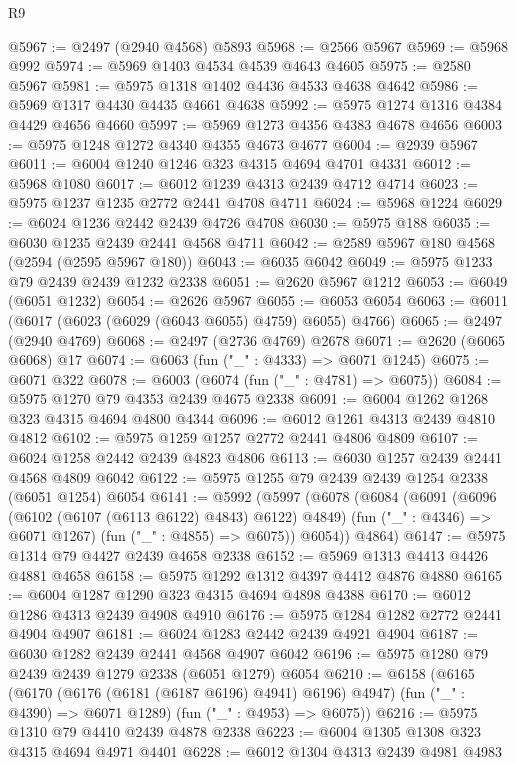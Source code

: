 \begin{lexlean}{R9}
\begin{coremodule}
@5967 := @2497 (@2940 @4568) @5893
@5968 := @2566 @5967
@5969 := @5968 @992
@5974 := @5969 @1403 @4534 @4539 @4643 @4605
@5975 := @2580 @5967
@5981 := @5975 @1318 @1402 @4436 @4533 @4638 @4642
@5986 := @5969 @1317 @4430 @4435 @4661 @4638
@5992 := @5975 @1274 @1316 @4384 @4429 @4656 @4660
@5997 := @5969 @1273 @4356 @4383 @4678 @4656
@6003 := @5975 @1248 @1272 @4340 @4355 @4673 @4677
@6004 := @2939 @5967
@6011 := @6004 @1240 @1246 @323 @4315 @4694 @4701 @4331
@6012 := @5968 @1080
@6017 := @6012 @1239 @4313 @2439 @4712 @4714
@6023 := @5975 @1237 @1235 @2772 @2441 @4708 @4711
@6024 := @5968 @1224
@6029 := @6024 @1236 @2442 @2439 @4726 @4708
@6030 := @5975 @188
@6035 := @6030 @1235 @2439 @2441 @4568 @4711
@6042 := @2589 @5967 @180 @4568 (@2594 (@2595 @5967 @180))
@6043 := @6035 @6042
@6049 := @5975 @1233 @79 @2439 @2439 @1232 @2338
@6051 := @2620 @5967 @1212
@6053 := @6049 (@6051 @1232)
@6054 := @2626 @5967
@6055 := @6053 @6054
@6063 := @6011 (@6017 (@6023 (@6029 (@6043 @6055) @4759) @6055) @4766)
@6065 := @2497 (@2940 @4769)
@6068 := @2497 (@2736 @4769) @2678
@6071 := @2620 (@6065 @6068) @17
@6074 := @6063 (fun ("_" : @4333) => @6071 @1245)
@6075 := @6071 @322
@6078 := @6003 (@6074 (fun ("_" : @4781) => @6075))
@6084 := @5975 @1270 @79 @4353 @2439 @4675 @2338
@6091 := @6004 @1262 @1268 @323 @4315 @4694 @4800 @4344
@6096 := @6012 @1261 @4313 @2439 @4810 @4812
@6102 := @5975 @1259 @1257 @2772 @2441 @4806 @4809
@6107 := @6024 @1258 @2442 @2439 @4823 @4806
@6113 := @6030 @1257 @2439 @2441 @4568 @4809 @6042
@6122 := @5975 @1255 @79 @2439 @2439 @1254 @2338 (@6051 @1254) @6054
@6141 := @5992
    (@5997
      (@6078
        (@6084
          (@6091
            (@6096 (@6102 (@6107 (@6113 @6122) @4843) @6122) @4849)
            (fun ("_" : @4346) => @6071 @1267)
            (fun ("_" : @4855) => @6075))
          @6054))
      @4864)
@6147 := @5975 @1314 @79 @4427 @2439 @4658 @2338
@6152 := @5969 @1313 @4413 @4426 @4881 @4658
@6158 := @5975 @1292 @1312 @4397 @4412 @4876 @4880
@6165 := @6004 @1287 @1290 @323 @4315 @4694 @4898 @4388
@6170 := @6012 @1286 @4313 @2439 @4908 @4910
@6176 := @5975 @1284 @1282 @2772 @2441 @4904 @4907
@6181 := @6024 @1283 @2442 @2439 @4921 @4904
@6187 := @6030 @1282 @2439 @2441 @4568 @4907 @6042
@6196 := @5975 @1280 @79 @2439 @2439 @1279 @2338 (@6051 @1279) @6054
@6210 := @6158
    (@6165
      (@6170 (@6176 (@6181 (@6187 @6196) @4941) @6196) @4947)
      (fun ("_" : @4390) => @6071 @1289)
      (fun ("_" : @4953) => @6075))
@6216 := @5975 @1310 @79 @4410 @2439 @4878 @2338
@6223 := @6004 @1305 @1308 @323 @4315 @4694 @4971 @4401
@6228 := @6012 @1304 @4313 @2439 @4981 @4983

\end{coremodule}
\end{lexlean}
